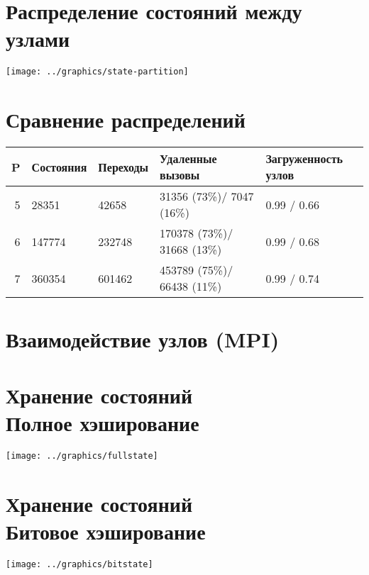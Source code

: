 \documentclass[12pt]{article}
\begin{document}
\section{Распределение состояний между узлами}
\label{sec:state-partitioning}

\begin{center}
  \texttt{[image: ../graphics/state-partition]}
\end{center}

\section{Сравнение распределений}
\label{sec:partition-compare}

\begin{tabular}[ht]{|r|l|l|p{}|p{}|}
  \hline 
  P & Состояния & Переходы & Удаленные вызовы & Загруженность узлов    \\ \hline
  5 & 28351     & 42658    & 31356  (73\%)/ 7047  (16\%) & 0.99 / 0.66 \\ \hline
  6 & 147774    & 232748   & 170378 (73\%)/ 31668 (13\%) & 0.99 / 0.68 \\ \hline
  7 & 360354    & 601462   & 453789 (75\%)/ 66438 (11\%) & 0.99 / 0.74 \\ \hline
\end{tabular}

\section{Взаимодействие узлов (MPI)}
\label{sec:mpi-interaction}

\section{Хранение состояний \\ \small{Полное хэширование}}
\label{sec:fullstate}

\begin{center}
  \texttt{[image: ../graphics/fullstate]}
\end{center}

\section{Хранение состояний \\ \small{Битовое хэширование}}
\label{sec:buthash}

\begin{center}
  \texttt{[image: ../graphics/bitstate]}
\end{center}
\end{document}
